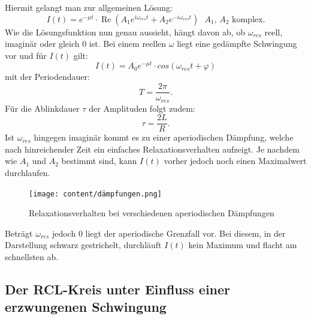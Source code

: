  
 Hiermit gelangt man zur allgemeinen Lösung:
 \begin{equation}
   I(t) = e^{-\mu t} \cdot  \operatorname{Re}\left( A_1e^{i\omega_{res} t} + A_2e^{-i\omega_{res} t} \right) \text{ } A_1\text{, } A_2 \text{ komplex.}
 \end{equation}
 Wie die Lösungsfunktion nun genau aussieht, hängt davon ab, ob $\omega_{res}$ reell, imaginär
  oder gleich 0 ist.
  Bei einem reellen $\omega$ liegt eine gedämpfte Schwingung vor und für $I(t)$ gilt:
  \begin{equation}
    I(t) = A_0 e^{-\mu t} \cdot cos(\omega_{res} t + \varphi)
  \end{equation}
 mit der Periodendauer:
  \begin{equation}
    T = \frac{2 \pi}{\omega_{res}}\text{.}
  \end{equation}
  Für die Ablinkdauer $\tau$ der Amplituden folgt zudem:
  \begin{equation}
    \tau = \frac{2L}{R}\text{.}
  \end{equation}
Ist $\omega_{res}$ hingegen imaginär kommt es zu einer
aperiodischen Dämpfung, welche nach hinreichender Zeit  ein einfaches Relaxationsverhalten
 aufzeigt. Je nachdem wie $A_1$ und $A_2$ bestimmt sind, kann $I(t)$ vorher jedoch noch einen
 Maximalwert durchlaufen.
 \begin{figure}[H]
   \centering
   \texttt{[image: content/dämpfungen.png]}
   \caption{Relaxationsverhalten bei verschiedenen aperiodischen Dämpfungen}
   \label{fig:Dämpfungen}
 \end{figure}
 Beträgt $\omega_{res}$ jedoch 0 liegt der aperiodische Grenzfall vor. Bei diesem, in der Darstellung schwarz gestrichelt,
  durchläuft $I(t)$ kein Maximum und flacht am schnellsten ab.

\subsection{ Der RCL-Kreis unter Einfluss einer erzwungenen Schwingung}

